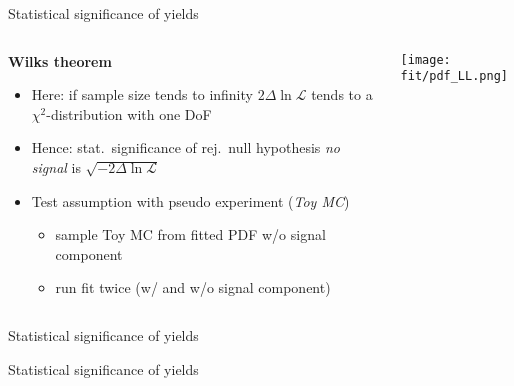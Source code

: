 \begin{frame}{Statistical significance of yields}
    \begin{columns}
        \begin{column}{.5\textwidth}
            \textbf{Wilks theorem}
            \begin{itemize}
                \item Here: \textcolor{vertexDarkRed}{if} sample size tends to infinity $2 \Delta\!\ln \mathcal{L}$ tends to a $\chi^2$-distribution with one DoF
                \item Hence: stat.\ significance of rej.\ null hypothesis \textit{no signal} is $\sqrt{-2 \Delta \! \ln \mathcal{L}}$
                \item Test assumption with pseudo experiment (\textit{Toy MC})
                \begin{itemize}
                    \item sample Toy MC from fitted PDF w/o signal component
                    \item run fit twice (w/ and w/o signal component)
                \end{itemize}
            \end{itemize}
        \end{column}
        \begin{column}{.5\textwidth}
            \centering
            \texttt{[image: fit/pdf\_LL.png]}
        \end{column}
    \end{columns}
\end{frame}

\begin{frame}{Statistical significance of yields}
    \centering
\end{frame}

\begin{frame}{Statistical significance of yields}
    \centering
\end{frame}

